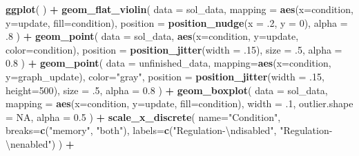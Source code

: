 \documentclass[]{book}
\newenvironment{Shaded}{\begin{snugshade}}{\end{snugshade}}
\newcommand{\CharTok}[1]{\textcolor[rgb]{0.31,0.60,0.02}{#1}}
\newcommand{\DataTypeTok}[1]{\textcolor[rgb]{0.13,0.29,0.53}{#1}}
\newcommand{\DecValTok}[1]{\textcolor[rgb]{0.00,0.00,0.81}{#1}}
\newcommand{\FloatTok}[1]{\textcolor[rgb]{0.00,0.00,0.81}{#1}}
\newcommand{\KeywordTok}[1]{\textcolor[rgb]{0.13,0.29,0.53}{\textbf{#1}}}
\newcommand{\NormalTok}[1]{#1}
\newcommand{\OperatorTok}[1]{\textcolor[rgb]{0.81,0.36,0.00}{\textbf{#1}}}
\newcommand{\OtherTok}[1]{\textcolor[rgb]{0.56,0.35,0.01}{#1}}
\newcommand{\StringTok}[1]{\textcolor[rgb]{0.31,0.60,0.02}{#1}}
\begin{document}
\begin{Shaded}
\begin{Highlighting}[]
\KeywordTok{ggplot}\NormalTok{( ) }\OperatorTok{+}
\StringTok{  }\KeywordTok{geom_flat_violin}\NormalTok{(}
    \DataTypeTok{data =}\NormalTok{ sol_data,}
    \DataTypeTok{mapping =} \KeywordTok{aes}\NormalTok{(}\DataTypeTok{x=}\NormalTok{condition, }\DataTypeTok{y=}\NormalTok{update, }\DataTypeTok{fill=}\NormalTok{condition),}
    \DataTypeTok{position =} \KeywordTok{position_nudge}\NormalTok{(}\DataTypeTok{x =} \FloatTok{.2}\NormalTok{, }\DataTypeTok{y =} \DecValTok{0}\NormalTok{),}
    \DataTypeTok{alpha =} \FloatTok{.8}
\NormalTok{  ) }\OperatorTok{+}
\StringTok{  }\KeywordTok{geom_point}\NormalTok{(}
    \DataTypeTok{data =}\NormalTok{ sol_data,}
    \KeywordTok{aes}\NormalTok{(}\DataTypeTok{x=}\NormalTok{condition, }\DataTypeTok{y=}\NormalTok{update, }\DataTypeTok{color=}\NormalTok{condition),}
    \DataTypeTok{position =} \KeywordTok{position_jitter}\NormalTok{(}\DataTypeTok{width =} \FloatTok{.15}\NormalTok{),}
    \DataTypeTok{size =} \FloatTok{.5}\NormalTok{,}
    \DataTypeTok{alpha =} \FloatTok{0.8}
\NormalTok{  ) }\OperatorTok{+}
\StringTok{  }\KeywordTok{geom_point}\NormalTok{(}
    \DataTypeTok{data =}\NormalTok{ unfinished_data,}
    \DataTypeTok{mapping=}\KeywordTok{aes}\NormalTok{(}\DataTypeTok{x=}\NormalTok{condition, }\DataTypeTok{y=}\NormalTok{graph_update),}
    \DataTypeTok{color=}\StringTok{"gray"}\NormalTok{,}
    \DataTypeTok{position =} \KeywordTok{position_jitter}\NormalTok{(}\DataTypeTok{width =} \FloatTok{.15}\NormalTok{, }\DataTypeTok{height=}\DecValTok{500}\NormalTok{),}
    \DataTypeTok{size =} \FloatTok{.5}\NormalTok{,}
    \DataTypeTok{alpha =} \FloatTok{0.8}
\NormalTok{  ) }\OperatorTok{+}
\StringTok{  }\KeywordTok{geom_boxplot}\NormalTok{(}
    \DataTypeTok{data =}\NormalTok{ sol_data,}
    \DataTypeTok{mapping =} \KeywordTok{aes}\NormalTok{(}\DataTypeTok{x=}\NormalTok{condition, }\DataTypeTok{y=}\NormalTok{update, }\DataTypeTok{fill=}\NormalTok{condition),}
    \DataTypeTok{width =} \FloatTok{.1}\NormalTok{,}
    \DataTypeTok{outlier.shape =} \OtherTok{NA}\NormalTok{,}
    \DataTypeTok{alpha =} \FloatTok{0.5}
\NormalTok{  ) }\OperatorTok{+}
\StringTok{  }\KeywordTok{scale_x_discrete}\NormalTok{(}
    \DataTypeTok{name=}\StringTok{"Condition"}\NormalTok{,}
    \DataTypeTok{breaks=}\KeywordTok{c}\NormalTok{(}\StringTok{"memory"}\NormalTok{, }\StringTok{"both"}\NormalTok{),}
    \DataTypeTok{labels=}\KeywordTok{c}\NormalTok{(}\StringTok{"Regulation-}\CharTok{\textbackslash{}n}\StringTok{disabled"}\NormalTok{, }\StringTok{"Regulation-}\CharTok{\textbackslash{}n}\StringTok{enabled"}\NormalTok{)}
\NormalTok{  ) }\OperatorTok{+}

\end{Highlighting}
\end{Shaded}
\end{document}
